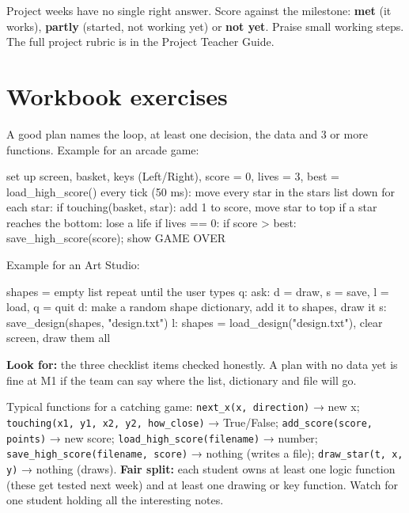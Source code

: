 
\begin{teachernote}
Project weeks have no single right answer. Score against the milestone: \textbf{met} (it works),
\textbf{partly} (started, not working yet) or \textbf{not yet}. Praise small working steps. The full
project rubric is in the Project Teacher Guide.
\end{teachernote}

\section{Workbook exercises}
\begin{answer}
A good plan names the loop, at least one decision, the data and 3 or more functions. Example for an
arcade game:
\begin{outputcode}
set up screen, basket, keys (Left/Right), score = 0, lives = 3, best = load_high_score()
every tick (50 ms):
    move every star in the stars list down
    for each star: if touching(basket, star): add 1 to score, move star to top
    if a star reaches the bottom: lose a life
    if lives == 0: if score > best: save_high_score(score); show GAME OVER
\end{outputcode}
Example for an Art Studio:
\begin{outputcode}
shapes = empty list
repeat until the user types q:
    ask: d = draw, s = save, l = load, q = quit
    d: make a random shape dictionary, add it to shapes, draw it
    s: save_design(shapes, "design.txt")
    l: shapes = load_design("design.txt"), clear screen, draw them all
\end{outputcode}
\textbf{Look for:} the three checklist items checked honestly. A plan with no data yet is fine at M1 if
the team can say where the list, dictionary and file will go.
\end{answer}

\begin{answer}
Typical functions for a catching game: \texttt{next\_x(x, direction)} → new x; \texttt{touching(x1, y1,
x2, y2, how\_close)} → True/False; \texttt{add\_score(score, points)} → new score;
\texttt{load\_high\_score(filename)} → number; \texttt{save\_high\_score(filename, score)} → nothing (writes a
file); \texttt{draw\_star(t, x, y)} → nothing (draws). \textbf{Fair split:} each student owns at
least one logic function (these get tested next week) and at least one drawing or key function.
Watch for one student holding all the interesting notes.
\end{answer}

